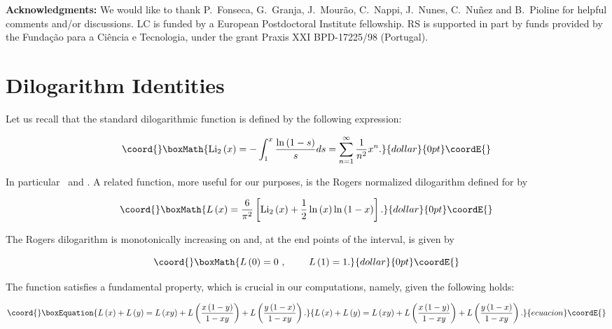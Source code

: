 \documentclass[a4paper,11pt]{article}
\providecommand{\vs}[1]{\vspace{#1 mm}}
\begin{document}
\vs{5}
\noindent
{\small 
{\bf Acknowledgments:}
We would like to thank P.~Fonseca, G.~Granja, J.~Mour\~ao, C.~Nappi,
J.~Nunes, C.~Nu\~nez and B.~Pioline for helpful comments and/or
discussions. LC is funded by a European Postdoctoral Institute
fellowship. RS is supported in part by funds provided by the Funda\c c\~ao
para a Ci\^encia e Tecnologia, under the grant Praxis XXI BPD-17225/98
(Portugal).
}

\eject

\appendix


\section{Dilogarithm Identities}


Let us recall that the standard dilogarithmic function is defined by the
following expression:

$$\coord{}\boxMath{
\mathrm{Li}_2\left( x\right) =- \int_{1}^{x}\frac{\ln \left( 1-s\right) }{s} 
ds=\sum_{n=1}^{\infty }\frac{1}{n^{2}} x^n.
}{dollar}{0pt}\coordE{}$$

\noindent
In particular\textrm{\ }\coordHE{} and \coordHE{}. A
related function, more useful for our purposes, is the Rogers normalized
dilogarithm \cite{Rogers} \coordHE{} defined for \coordHE{} by 

$$\coord{}\boxMath{
L\left( x\right) =\frac{6}{\pi ^{2}}\left[ \mathrm{Li}_2\left( x\right) + 
\frac{1}{2}\ln \left( x\right) \ln \left( 1-x\right) \right] .
}{dollar}{0pt}\coordE{}$$

\noindent
The Rogers dilogarithm is monotonically increasing on \myHighlight{$\left[ 0,1\right] $}\coordHE{}
and, at the end points of the interval, is given by

$$\coord{}\boxMath{
L\left( 0\right) =0\ , \ \ \ \ \ \ \ L\left( 1\right) =1.
}{dollar}{0pt}\coordE{}$$

\noindent
The function \coordHE{} satisfies a fundamental property, which is crucial in our
computations, namely, given \coordHE{} the following holds:

\begin{equation}\coord{}\boxEquation{
L\left( x\right) +L\left( y\right) =L\left( xy\right) +L\left( \frac{x\left(
1-y\right) }{1-xy}\right) +L\left( \frac{y\left( 1-x\right) }{1-xy}\right) .
\label{app1}
}{
L\left( x\right) +L\left( y\right) =L\left( xy\right) +L\left( \frac{x\left(
1-y\right) }{1-xy}\right) +L\left( \frac{y\left( 1-x\right) }{1-xy}\right) .
}{ecuacion}\coordE{}\end{equation}
\end{document}

